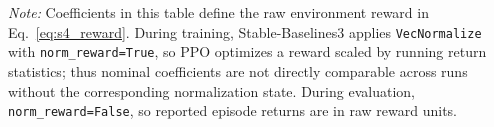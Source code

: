 \documentclass[conference]{IEEEtran}
\begin{document}
\begin{table}[t]
\begin{tabular}{@{}p{2.2cm}p{9.2cm}p{4.2cm}@{}}
\bottomrule
\end{tabular}
\vspace{2pt}
\begin{minipage}{0.98\textwidth}
\footnotesize \textit{Note:} Coefficients in this table define the raw environment reward in Eq.~\ref{eq:s4_reward}. During training, Stable-Baselines3 applies \texttt{VecNormalize} with \texttt{norm\_reward=True}, so PPO optimizes a reward scaled by running return statistics; thus nominal coefficients are not directly comparable across runs without the corresponding normalization state. During evaluation, \texttt{norm\_reward=False}, so reported episode returns are in raw reward units.
\end{minipage}
\end{table}
\end{document}
